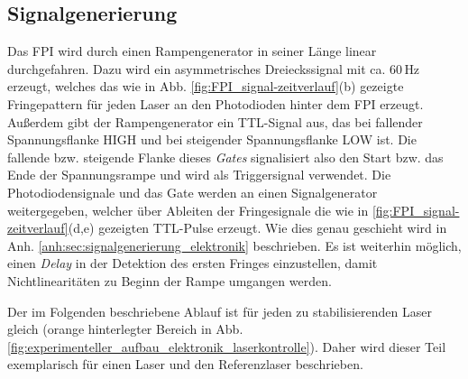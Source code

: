\subsection{Signalgenerierung}\label{subsec:signalgenerierung}
Das FPI wird durch einen Rampengenerator in seiner Länge linear durchgefahren.
Dazu wird ein asymmetrisches Dreieckssignal mit ca. $60\,$Hz erzeugt, welches
das wie in Abb.
\ref{fig:FPI_signal-zeitverlauf}(b) gezeigte Fringepattern für jeden Laser
an den Photodioden hinter dem FPI erzeugt. Außerdem gibt der Rampengenerator
ein TTL-Signal aus, das bei fallender Spannungsflanke HIGH und bei
steigender Spannungsflanke LOW ist. Die fallende bzw. steigende Flanke dieses
\textit{Gates} signalisiert also den Start bzw. das Ende der Spannungsrampe
und wird als Triggersignal verwendet. Die Photodiodensignale und das
Gate werden an einen Signalgenerator weitergegeben, welcher über Ableiten der
Fringesignale die wie in \ref{fig:FPI_signal-zeitverlauf}(d,e) gezeigten TTL-Pulse erzeugt.
Wie dies genau geschieht wird in Anh.
\ref{anh:sec:signalgenerierung_elektronik} beschrieben. Es ist weiterhin
möglich, einen \textit{Delay} in der Detektion des ersten Fringes einzustellen,
damit Nichtlinearitäten zu Beginn der Rampe umgangen werden.\par
Der im Folgenden beschriebene Ablauf ist für jeden zu stabilisierenden Laser
gleich (orange hinterlegter Bereich in Abb.
\ref{fig:experimenteller_aufbau_elektronik_laserkontrolle}). Daher wird dieser
Teil exemplarisch für einen Laser und den Referenzlaser beschrieben.

